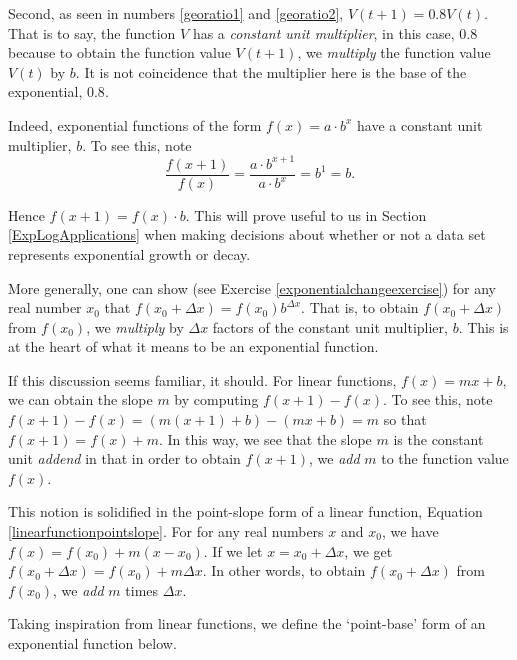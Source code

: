\documentclass{ximera}
\begin{document}
\smallskip

Second, as seen in numbers \ref{georatio1} and \ref{georatio2},  $V(t+1) = 0.8 V(t)$.  That is to say, the function $V$ has a \textit{constant unit multiplier}, in this case, $0.8$ because to obtain the function value $V(t+1)$, we \textit{multiply} the function value $V(t)$ by $b$.   It is not coincidence that the multiplier here is the base of the exponential, $0.8$.

\smallskip

Indeed, exponential functions of the form $f(x) = a \cdot b^{x}$  have a constant unit multiplier, $b$.  To see this,  note \[ \dfrac{f(x+1)}{f(x)} = \dfrac{a \cdot b^{x+1}}{ a \cdot b^{x}} = b^{1} = b.\]

Hence $f(x+1) = f(x) \cdot b$.  This will prove useful to us in Section \ref{ExpLogApplications} when making decisions about whether or not a data set represents exponential growth or decay.  

\smallskip

More generally, one can show (see Exercise \ref{exponentialchangeexercise}) for any real number $x_{0}$ that $f(x_{0}+\Delta x) = f(x_{0}) b^{\Delta x}$. That is, to obtain $f(x_{0} + \Delta x)$ from $f(x_{0})$, we \textit{multiply} by $\Delta x$ factors of the constant unit multiplier, $b$.  This is at the heart of what it means to be an exponential function.

\smallskip

If this discussion seems familiar, it should.  For linear functions, $f(x) = mx +b$, we can obtain the slope $m$ by computing $f(x+1) - f(x)$.  To see this, note $f(x+1) - f(x)  = (m(x+1) +b) - (mx+b) = m$ so that $f(x+1) = f(x) + m$.  In this way, we see that the slope $m$ is the constant unit \textit{addend} in that in order to obtain $f(x+1)$, we \textit{add} $m$ to the function value $f(x)$.  

\smallskip

This notion is solidified in the point-slope form of a linear function,  Equation \ref{linearfunctionpointslope}.  For for any real numbers $x$ and $x_{0}$, we have   $f(x) = f(x_{0}) + m(x-x_{0})$.  If we let $x = x_{0}+ \Delta x$, we get $f(x_{0}+ \Delta x) = f(x_{0}) + m \Delta x$.  In other words, to obtain $f(x_{0}+\Delta x)$ from $f(x_{0})$, we \textit{add} $m$ times $\Delta x$. 

\smallskip

Taking inspiration from linear functions, we define the `point-base' form of an exponential function below.
\end{document}
